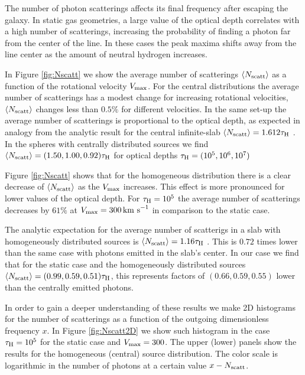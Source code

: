 \documentclass{emulateapj}
\newcommand{\ly}{{\ifmmode{{\rm Ly}\alpha~}\else{Ly$\alpha$~}\fi}}
\newcommand{\kms}{{\ifmmode{{\mathrm{\,km\ s}^{-1}}}\else{\,km~s$^{-1}$}\fi}}
\begin{document}
The number of \ly photon scatterings affects its final frequency after
escaping the galaxy. In static gas geometries, a large value of the
optical depth correlates with a high number of scatterings, increasing
the probability of finding a \ly photon far from the center of the
line. In these cases the peak maxima shifts away from the line center as
the amount of neutral hydrogen increases. 


In Figure \ref{fig:Nscatt} we show the average number of scatterings
$\langle N_{\rm scatt}\rangle$ as a function of the rotational velocity
$V_{\rm max}$. For the central distributions the average number of
scatterings has a modest change for increasing rotational
velocities, $\langle N_{\rm scatt}\rangle$ changes less than $0.5\%$
for different velocities. In the same set-up the average
number of scatterings is proportional to the optical depth, as
expected in analogy from the analytic result for the central
infinite-slab $\langle N_{\rm  scatt}\rangle=1.612\tau_{\rm   H}$
\citep{Adams72,Harrington73}. In the spheres with centrally
distributed sources we find $\langle N_{\rm
  scatt}\rangle= (1.50, 1.00, 0.92)\tau_{\rm   H}$ for optical depths
$\tau_{\rm H} = (10^{5}, 10^{6}, 10^{7})$


Figure \ref{fig:Nscatt} shows that for the homogeneous distribution
there is a clear decrease of $\langle N_{\rm  scatt}\rangle$ as the
$V_{\rm max}$ increases. This effect is more pronounced for lower
values of the optical depth. For $\tau_{\rm H}=10^5$ the average
number of scatterings decreases by $61\%$ at $V_{\rm max}=300\kms$ in
comparison to the static case. 


The analytic expectation for the average number of scatterigs in a
slab with homogeneously distributed sources is $\langle N_{\rm
  scatt}\rangle=1.16\tau_{\rm   H}$ \citep{Harrington73}. This is
$0.72$ times lower than the same case with photons emitted in the
slab's center. In our case we find that for the static case and the
homogeneously distributed sources $\langle N_{\rm scatt}\rangle=
(0.99, 0.59, 0.51)\tau_{\rm   H}$, this represents factors of $(0.66,
0.59, 0.55)$ lower than the centrally emitted  photons.  

In order to gain a deeper understanding of these results we make 2D
histograms for the number of scatterings as a function of the outgoing
dimensionless frequency $x$. In Figure \ref{fig:Nscatt2D} we show
such histogram in the case $\tau_{\rm H}=10^5$ for the
static case and $V_{\rm max}=300$\kms. The upper (lower) panels show the
results for the homogeneous (central) source distribution. The color
scale is logarithmic in the number of photons at a certain value
$x-N_{\rm scatt}$. 
\end{document}
